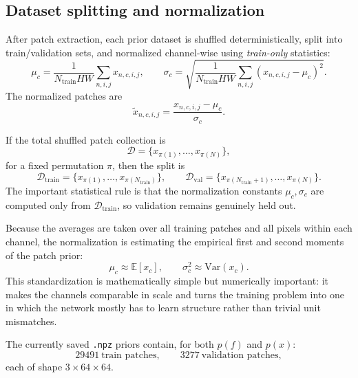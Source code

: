 \documentclass[11pt]{article}
\newcommand{\EE}{\mathbb{E}}
\newcommand{\Var}{\mathrm{Var}}
\begin{document}
\subsection{Dataset splitting and normalization}

After patch extraction, each prior dataset is shuffled deterministically, split into train/validation sets, and normalized channel-wise using \emph{train-only} statistics:
\begin{equation}
  \mu_c = \frac{1}{N_{\mathrm{train}}HW}
  \sum_{n,i,j} x_{n,c,i,j},
  \qquad
  \sigma_c = \sqrt{
    \frac{1}{N_{\mathrm{train}}HW}
    \sum_{n,i,j} (x_{n,c,i,j}-\mu_c)^2
  }.
\end{equation}
The normalized patches are
\begin{equation}
  \tilde x_{n,c,i,j} = \frac{x_{n,c,i,j} - \mu_c}{\sigma_c}.
\end{equation}

If the total shuffled patch collection is
\begin{equation}
  \mathcal D = \{x_{\pi(1)},\dots,x_{\pi(N)}\},
\end{equation}
for a fixed permutation \(\pi\), then the split is
\begin{equation}
  \mathcal D_{\mathrm{train}} = \{x_{\pi(1)},\dots,x_{\pi(N_{\mathrm{train}})}\},
  \qquad
  \mathcal D_{\mathrm{val}} = \{x_{\pi(N_{\mathrm{train}}+1)},\dots,x_{\pi(N)}\}.
\end{equation}
The important statistical rule is that the normalization constants \(\mu_c,\sigma_c\) are computed only from \(\mathcal D_{\mathrm{train}}\), so validation remains genuinely held out.

Because the averages are taken over all training patches and all pixels within each channel, the normalization is estimating the empirical first and second moments of the patch prior:
\begin{equation}
  \mu_c \approx \EE[x_c],
  \qquad
  \sigma_c^2 \approx \Var(x_c).
\end{equation}
This standardization is mathematically simple but numerically important: it makes the channels comparable in scale and turns the training problem into one in which the network mostly has to learn structure rather than trivial unit mismatches.

The currently saved \texttt{.npz} priors contain, for both \(p(f)\) and \(p(x)\):
\begin{equation}
  29491\ \text{train patches}, \qquad 3277\ \text{validation patches},
\end{equation}
each of shape \(3\times 64\times 64\).
\end{document}
